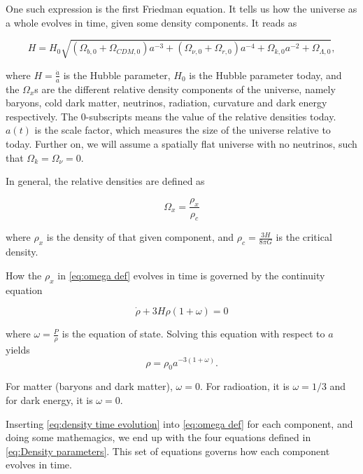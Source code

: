 \documentclass[12pt]{article}
\begin{document}
One such expression is the first Friedman equation. It tells us how the universe as a whole evolves in time, given some density components. It reads as 

\begin{equation}\label{eq:Friedmann Equation}
    H = H_0\sqrt{\left(\Omega_{b,0} + \Omega_{CDM,0}\right)a^{-3} + \left(\Omega_{\nu,0} + \Omega_{r,0}\right) a^{-4} + \Omega_{k,0} a^{-2} + \Omega_{\Lambda,0}},
\end{equation}

where $H=\frac{\dot{a}}{a}$ is the Hubble parameter, $H_0$ is the Hubble parameter today, and the $\Omega_{x}$s are the different relative density components of the universe, namely baryons, cold dark matter, neutrinos, radiation, curvature and dark energy respectively. The 0-subscripts means the value of the relative densities today.  $a(t)$ is the scale factor, which measures the size of the universe relative to today. Further on, we will assume a spatially flat universe with no neutrinos, such that $\Omega_k = \Omega_{\nu} = 0$.

In general, the relative densities are defined as 

\begin{equation}\label{eq:omega def}
    \Omega_x = \frac{\rho_x}{\rho_c}
\end{equation}

where $\rho_x$ is the density of that given component, and $\rho_c = \frac{3H}{8\pi G}$ is the critical density. 

How the $\rho_x$ in \cref{eq:omega def} evolves in time is governed by the continuity equation 

\begin{equation}
    \dot{\rho} + 3H\rho(1 + \omega) = 0
\end{equation}

where $\omega = \frac{P}{\rho}$ is the equation of state. Solving this equation with respect to $a$ yields 
\begin{equation}\label{eq:density time evolution}
\rho = \rho_0 a^{-3(1+\omega)}.
\end{equation}

For matter (baryons and dark matter), $\omega = 0$. For radioation, it is $\omega = 1/3$ and for dark energy, it is $\omega = 0$. 

Inserting \cref{eq:density time evolution} into \cref{eq:omega def} for each component, and doing some mathemagics, we end up with the four equations defined in \cref{eq:Density parameters}. This set of equations governs how each component evolves in time. 
\end{document}
